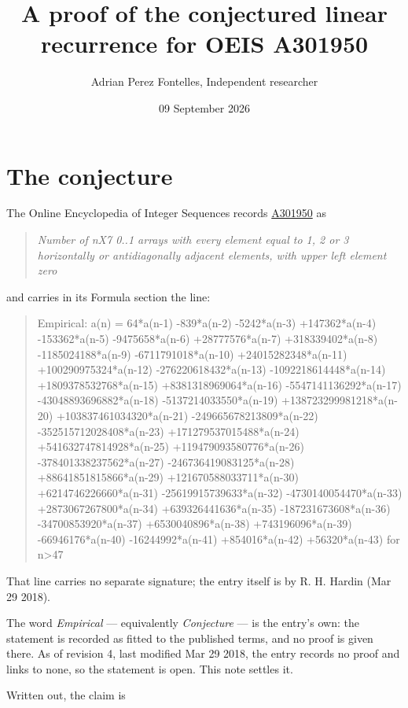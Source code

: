 \documentclass[11pt]{article}
\title{A proof of the conjectured linear recurrence for OEIS A301950}
\author{Adrian Perez Fontelles, Independent researcher}
\date{09 September 2026}
\theoremstyle{definition}
\begin{document}
\maketitle
\section{The conjecture}

The Online Encyclopedia of Integer Sequences records \href{https://oeis.org/A301950}{A301950} as

\begin{quote}\itshape Number of nX7 0..1 arrays with every element equal to 1, 2 or 3 horizontally or antidiagonally adjacent elements, with upper left element zero\end{quote}

and carries in its Formula section the line:

\begin{quote}\ttfamily Empirical: a(n) = 64*a(n-1) -839*a(n-2) -5242*a(n-3) +147362*a(n-4) -153362*a(n-5) -9475658*a(n-6) +28777576*a(n-7) +318339402*a(n-8) -1185024188*a(n-9) -6711791018*a(n-10) +24015282348*a(n-11) +100290975324*a(n-12) -276220618432*a(n-13) -1092218614448*a(n-14) +1809378532768*a(n-15) +8381318969064*a(n-16) -5547141136292*a(n-17) -43048893696882*a(n-18) -5137214033550*a(n-19) +138723299981218*a(n-20) +103837461034320*a(n-21) -249665678213809*a(n-22) -352515712028408*a(n-23) +171279537015488*a(n-24) +541632747814928*a(n-25) +119479093580776*a(n-26) -378401338237562*a(n-27) -246736419083125*a(n-28) +88641851815866*a(n-29) +121670588033711*a(n-30) +6214746226660*a(n-31) -25619915739633*a(n-32) -4730140054470*a(n-33) +2873067267800*a(n-34) +639326441636*a(n-35) -187231673608*a(n-36) -34700853920*a(n-37) +6530040896*a(n-38) +743196096*a(n-39) -66946176*a(n-40) -16244992*a(n-41) +854016*a(n-42) +56320*a(n-43) for n>47\end{quote}

That line carries no separate signature; the entry itself is by R. H. Hardin (Mar 29 2018).

The word {\itshape Empirical} --- equivalently {\itshape Conjecture} --- is the entry's own: the statement is recorded as fitted to the published terms, and no proof is given there. As of revision 4, last modified Mar 29 2018, the entry records no proof and links to none, so the statement is open. This note settles it.

Written out, the claim is
\end{document}
